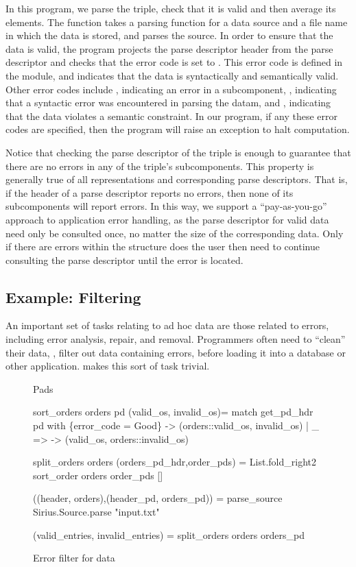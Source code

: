 In this program, we parse the triple, check that it is valid and then
average its elements. The function  takes a parsing
function for a data source and a file name in which the data is
stored, and parses the source. In order to ensure that the data is
valid, the program projects the parse descriptor header from the parse
descriptor  and checks that the error code is set to .
This error code is defined in the  module, and indicates that
the data is syntactically and semantically valid. Other error codes
include , indicating an error in a subcomponent, ,
indicating that a syntactic error was encountered in parsing the
datam, and , indicating that the data violates a semantic
constraint. In our program, if any these error codes are specified,
then the program will raise an exception to halt computation.

Notice that checking the parse descriptor of the triple is enough to
guarantee that there are no errors in any of the triple's
subcomponents. This property is generally true of all representations
and corresponding parse descriptors. That is, if the header of a parse
descriptor reports no errors, then none of its subcomponents will
report errors. In this way, we support a ``pay-as-you-go'' approach to
application error handling, as the parse descriptor for valid data
need only be consulted once, no matter the size of the corresponding
data. Only if there are errors within the structure does the user then
need to continue consulting the parse descriptor until the error is
located.

\subsection{Example: Filtering}
\label{sec:ex-filter}

An important set of tasks relating to ad hoc data are those related to
errors, including error analysis, repair, and removal.  Programmers
often need to ``clean'' their data, \ie{}, filter out data containing
errors, before loading it into a database or other application.
\padsml{} makes this sort of task trivial.

\begin{figure}
\begin{code}\scriptsize
{} Pads

 sort_orders orders pd (valid_os, invalid_os)=
   match get\_pd\_hdr pd with
    \{error_code = Good\} -> (orders::valid_os, invalid_os)
   | _ => -> (valid_os, orders::invalid_os)

 split_orders orders (orders_pd_hdr,order_pds) = 
   List.fold_right2 sort_order orders order_pds []

 ((header, orders),(header_pd, orders_pd)) = 
   parse_source Sirius.Source.parse "input.txt"

 (valid_entries, invalid_entries) = 
   split_orders orders orders_pd\end{code}
\caption{Error filter for \dibbler{} data}
\label{fig:ex-data-clean}
\end{figure}

